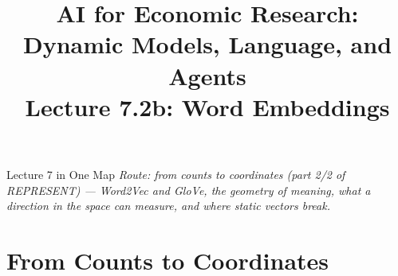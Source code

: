 



\graphicspath{{./pic/}{../../MiniCourse_8hr/Slides/Module3_LLM_Text/pic/}{../}}

\usetikzlibrary{arrows.meta,positioning,shapes,calc}



\title[AI for Econ Research]{AI for Economic Research: Dynamic Models, Language, and Agents\\
Lecture 7.2b: Word Embeddings}



\makebeamertitle

\begin{frame}{Lecture 7 in One Map}
\medskip
\textit{\footnotesize Route: from counts to coordinates (part 2/2 of REPRESENT) --- Word2Vec and GloVe, the geometry of meaning, what a direction in the space can measure, and where static vectors break.}
\end{frame}

\section{From Counts to Coordinates}

